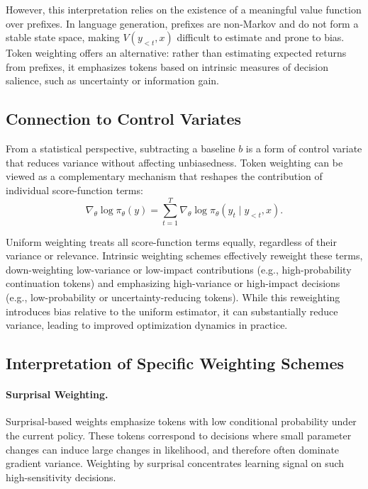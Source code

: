 However, this interpretation relies on the existence of a meaningful value function over
prefixes. In language generation, prefixes are non-Markov and do not form a stable state
space, making $V(y_{<t}, x)$ difficult to estimate and prone to bias. Token weighting
offers an alternative: rather than estimating expected returns from prefixes, it
emphasizes tokens based on intrinsic measures of decision salience, such as uncertainty
or information gain.

\subsection{Connection to Control Variates}

From a statistical perspective, subtracting a baseline $b$ is a form of control variate
that reduces variance without affecting unbiasedness. Token weighting can be viewed as a
complementary mechanism that reshapes the contribution of individual score-function
terms:
\begin{equation}
\nabla_\theta \log \pi_\theta(y) = \sum_{t=1}^{T} \nabla_\theta \log \pi_\theta(y_t \mid y_{<t}, x).
\end{equation}

Uniform weighting treats all score-function terms equally, regardless of their variance
or relevance. Intrinsic weighting schemes effectively reweight these terms,
down-weighting low-variance or low-impact contributions (e.g., high-probability
continuation tokens) and emphasizing high-variance or high-impact decisions (e.g.,
low-probability or uncertainty-reducing tokens). While this reweighting introduces bias
relative to the uniform estimator, it can substantially reduce variance, leading to
improved optimization dynamics in practice.

\subsection{Interpretation of Specific Weighting Schemes}

\paragraph{Surprisal Weighting.}
Surprisal-based weights emphasize tokens with low conditional probability under the
current policy. These tokens correspond to decisions where small parameter changes can
induce large changes in likelihood, and therefore often dominate gradient variance.
Weighting by surprisal concentrates learning signal on such high-sensitivity decisions.

